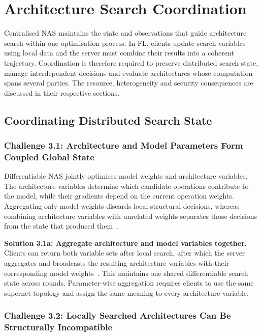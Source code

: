 \section{Architecture Search Coordination}

Centralised NAS maintains the state and observations that guide architecture search within one optimisation process. In FL, clients update search variables using local data and the server must combine their results into a coherent trajectory. Coordination is therefore required to preserve distributed search state, manage interdependent decisions and evaluate architectures whose computation spans several parties. The resource, heterogeneity and security consequences are discussed in their respective sections.

\subsection{Coordinating Distributed Search State}

\subsubsection{Challenge 3.1: Architecture and Model Parameters Form Coupled Global State}

Differentiable NAS jointly optimises model weights and architecture variables. The architecture variables determine which candidate operations contribute to the model, while their gradients depend on the current operation weights. Aggregating only model weights discards local structural decisions, whereas combining architecture variables with unrelated weights separates those decisions from the state that produced them~\cite{fednas_2021,dfnas_2020,feathers_2023}.

\noindent\textbf{Solution 3.1a: Aggregate architecture and model variables together.} Clients can return both variable sets after local search, after which the server aggregates and broadcasts the resulting architecture variables with their corresponding model weights~\cite{fednas_2021,dfnas_2020,feathers_2023}. This maintains one shared differentiable search state across rounds. Parameter-wise aggregation requires clients to use the same supernet topology and assign the same meaning to every architecture variable.

\subsubsection{Challenge 3.2: Locally Searched Architectures Can Be Structurally Incompatible}

